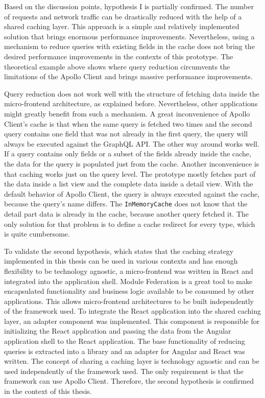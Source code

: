 \bigskip

\noindent Based on the discussion points, hypothesis I is partially confirmed. The number of requests and network traffic can be drastically reduced with the help of a shared caching layer. This approach is a simple and relatively implemented solution that brings enormous performance improvements. Nevertheless, using a mechanism to reduce queries with existing fields in the cache does not bring the desired performance improvements in the contexts of this prototype. The theoretical example above shows where query reduction circumvents the limitations of the Apollo Client and brings massive performance improvements.

\bigskip

\noindent Query reduction does not work well with the structure of fetching data inside the micro-frontend architecture, as explained before. Nevertheless, other applications might greatly benefit from such a mechanism. A great inconvenience of Apollo Client's cache is that when the same query is fetched two times and the second query contains one field that was not already in the first query, the query will always be executed against the GraphQL \ac{API}. The other way around works well. If a query contains only fields or a subset of the fields already inside the cache, the data for the query is populated just from the cache. Another inconvenience is that caching works just on the query level. The prototype mostly fetches part of the data inside a list view and the complete data inside a detail view. With the default behavior of Apollo Client, the query is always executed against the cache, because the query's name differs. The \texttt{InMemoryCache} does not know that the detail part data is already in the cache, because another query fetched it. The only solution for that problem is to define a cache redirect for every type, which is quite cumbersome.

\bigskip

\noindent To validate the second hypothesis, which states that the caching strategy implemented in this thesis can be used in various contexts and has enough flexibility to be technology agnostic, a micro-frontend was written in React and integrated into the application shell. Module Federation is a great tool to make encapsulated functionality and business logic available to be consumed by other applications. This allows micro-frontend architectures to be built independently of the framework used. To integrate the React application into the shared caching layer, an adapter component was implemented. This component is responsible for initializing the React application and passing the data from the Angular application shell to the React application. The base functionality of reducing queries is extracted into a library and an adapter for Angular and React was written. The concept of sharing a caching layer is technology agnostic and can be used independently of the framework used. The only requirement is that the framework can use Apollo Client. Therefore, the second hypothesis is confirmed in the context of this thesis.
